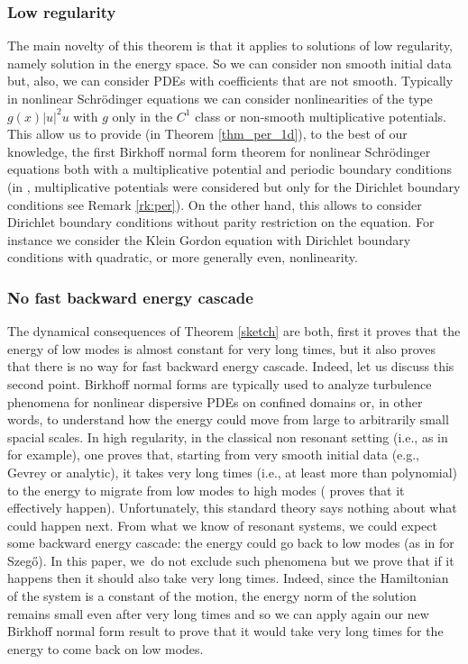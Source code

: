 \documentclass[11pt]{article}
\newcommand{\ie}{i.e.,\xspace}
\newcommand{\eg}{e.g.,\xspace}
\theoremstyle{definition}
\begin{document}
\subsubsection*{Low regularity}
The main novelty of this theorem is that it applies to solutions of low regularity, namely solution in the energy space. So we can consider non smooth initial data but, also, we can consider PDEs with coefficients that are not smooth. Typically in nonlinear Schrödinger equations we can consider nonlinearities of the type $g(x)|u|^2u$ with $g$ only in the $C^1$ class or non-smooth multiplicative potentials. This allow us to provide (in Theorem \ref{thm_per_1d}), to the best of our knowledge, the first Birkhoff normal form theorem for nonlinear Schrödinger equations both with a multiplicative potential and periodic boundary conditions (in \cite{BG06}, multiplicative potentials were considered but only for the Dirichlet boundary conditions see Remark \ref{rk:per}). On the other hand, this allows to consider Dirichlet boundary conditions without parity restriction on the equation. For instance we consider the Klein Gordon equation with Dirichlet boundary conditions with quadratic, or more generally even, nonlinearity.

\subsubsection*{No fast backward energy cascade}
The dynamical consequences of Theorem \ref{sketch} are both, first it proves that the energy of low modes is almost constant for very long times, but it also proves that there is no way for fast backward energy cascade. Indeed, let us discuss this second point. Birkhoff normal forms are typically used to analyze turbulence phenomena for nonlinear dispersive PDEs on confined domains or, in other words, to understand how the energy could move from large to arbitrarily small spacial scales. In high regularity, in the classical non resonant setting (\ie as in \cite{BG06} for example), one proves that, starting from very smooth initial data (\eg Gevrey or analytic), it takes very long times (\ie at least more than polynomial) to the energy to migrate from low modes to high modes (\cite{Gua14} proves that it effectively happen). Unfortunately, this standard theory says nothing about what could happen next. From what we know of resonant systems, we could expect some backward energy cascade: the energy could go back to low modes (as in \cite{GG17} for Szegő). In this paper, we~do not exclude such phenomena but we prove that if it happens then it should also take very long times. Indeed, since the Hamiltonian of the system is a constant of the motion, the energy norm of the solution remains small even after very long times and so we can apply again our new Birkhoff normal form result to prove that it would take very long times for the energy to come back on low modes.
\end{document}
